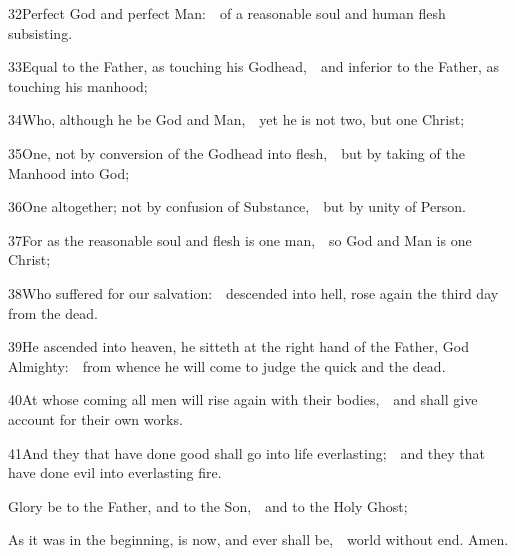 32\enspace Perfect God and perfect Man:\ \star\ of a reasonable soul and human flesh subsisting.

33\enspace Equal to the Father, as touching his Godhead,\ \star\ and inferior to the Father, as touching his manhood;

34\enspace Who, although he be God and Man,\ \star\ yet he is not two, but one Christ;

35\enspace One, not by conversion of the Godhead into flesh,\ \star\ but by taking of the Manhood into God;

36\enspace One altogether; not by confusion of Substance,\ \star\ but by unity of Person.

37\enspace For as the reasonable soul and flesh is one man,\ \star\ so God and Man is one Christ;

38\enspace Who suffered for our salvation:\ \star\ descended into hell, rose again the third day from the dead.

39\enspace He ascended into heaven, he sitteth at the right hand of the Father, God Almighty:\ \star\ from whence he will come to judge the quick and the dead.

40\enspace At whose coming all men will rise again with their bodies,\ \star\ and shall give account for their own works.

41\enspace And they that have done good shall go into life everlasting;\ \star\ and they that have done evil into everlasting fire.


Glory be to the Father, and to the Son,\ \star\ and to the Holy Ghost;

As it was in the beginning, is now, and ever shall be,\ \star\ world without end. Amen.

\fleuron